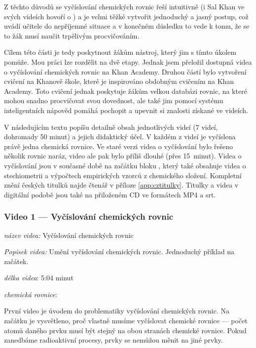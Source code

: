 \documentclass[a4paper, 12pt]{article}
\begin{document}
Z těchto důvodů se vyčíslování chemických rovnic řeší intuitivně (i Sal Khan ve svých videích hovoří o ) a je velmi těžké vytvořit jednoduchý a jasný postup, což uvádí učitele do nepříjemné situace a v konečném důsledku to vede k tomu, že se to žák musí naučit trpělivým procvičováním. 

Cílem této části je tedy poskytnout žákům nástroj, který jim s tímto úkolem pomůže. Mou práci lze rozdělit na dvě etapy. Jednak jsem přeložil dostupná videa o vyčíslování chemických rovnic na Khan Academy. Druhou částí bylo vytvoření cvičení na Khanově škole, které je inspirováno obdobným cvičením na Khan Academy. Toto cvičení jednak poskytuje žákům velkou databázi rovnic, na které mohou snadno procvičovat svou dovednost, ale také jim pomocí systému inteligentních nápověd pomáhá pochopit a upevnit si znalosti získané ve videích.

V následujícím textu popíšu detailně obsah jednotlivých videí (7 videí, dohromady 50 minut) a jejich didaktický účel. V každém z videí je vyčíslena právě jedna chemická rovnice. Ve staré verzi videa o vyčíslování bylo řešeno několik rovnic naráz, video ale pak bylo příliš dlouhé (přes 15~minut). Videa o vyčíslování jsou v současné době na začátku bloku , který také obsahuje videa o stechiometrii a výpočtech empirických vzorců z chemického složení. Kompletní znění českých titulků najde čtenář v příloze \ref{app:cztitulky}. Titulky a videa v digitální podobě jsou také na přiloženém CD ve formátech MP4 a srt.

\subsubsection{Video 1 --- Vyčíslování chemických rovnic}
\textit{název videa:} Vyčíslování chemických rovnic

\noindent
\textit{Popisek videa:} Umění vyčíslování chemických rovnic. Jednoduchý příklad na začátek.

\noindent
\textit{délka videa}: 5:04 minut

\noindent
\textit{chemická rovnice}: 


První video je úvodem do problematiky vyčíslování chemických rovnic. Na začátku je vysvětleno, proč vlastně musíme vyčíslovat chemické rovnice --- počet atomů daného prvku musí být stejný na obou stranách chemické rovnice. Pokud zanedbáme radioaktivní procesy, prvky se nemůžou měnit na jiné prvky. 
\end{document}
